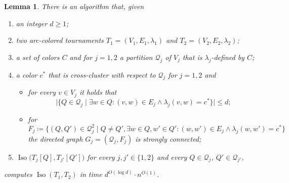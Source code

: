 \PassOptionsToPackage{dvipsnames,svgnames}{xcolor}\documentclass[10pt,a4paper]{article}
\newtheorem{lemma}{Lemma}[section]
\newcommand{\CQ}{{\mathcal Q}}
\newcommand{\bigmid}{\;\big|\;}
\DeclareMathOperator{\Iso}{Iso}
\begin{document}
\begin{lemma}
 \label{lem:lift-isomorphisms}
 There is an algorithm that, given
 \begin{enumerate}[label = (\Alph*)]
  \item\label{item:lift-isomorphisms-1} an integer $d \geq 1$;
  \item\label{item:lift-isomorphisms-2} two arc-colored tournaments $T_1=(V_1,E_1,\lambda_1)$ and $T_2=(V_2,E_2,\lambda_2)$;
  \item\label{item:lift-isomorphisms-3} a set of colors $C$ and for $j=1,2$ a partition $\CQ_j$ of $V_j$ that is $\lambda_j$-defined by $C$;
  \item\label{item:lift-isomorphisms-4} a color $c^*$ that is cross-cluster with respect to $\CQ_j$ for $j=1,2$ and
   \begin{itemize}
    \item for every $v \in V_j$ it holds that
     \[\big|\big\{Q \in \CQ_j \bigmid \exists w \in Q\colon (v,w) \in E_j \wedge \lambda_j(v,w) = c^*\big\}\big| \leq d;\]
    \item for
     \[F_j \coloneqq \big\{(Q,Q')\in\CQ_j^2 \bigmid Q\neq Q', \exists w \in Q,w' \in Q'\colon (w,w') \in E_j \wedge \lambda_j(w,w') = c^*\big\}\]
     the directed graph $G_j = (\CQ_j,F_j)$ is strongly connected;
   \end{itemize}
  \item\label{item:lift-isomorphisms-5} $\Iso\big(T_j[Q],T_{j'}[Q']\big)$ for every $j,j' \in \{1,2\}$ and every $Q \in \CQ_j$, $Q' \in \CQ_{j'}$,
 \end{enumerate}
 computes $\Iso(T_1,T_2)$ in time $d^{O(\log d)} \cdot n^{O(1)}$.
\end{lemma}
\end{document}
